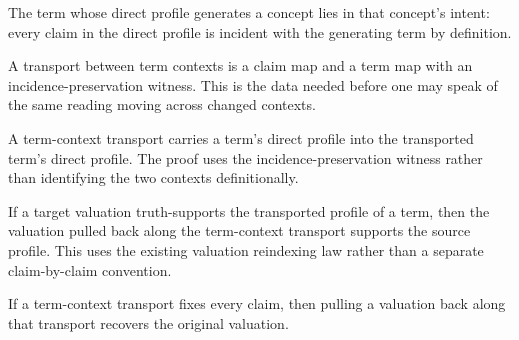\begin{theorem}\label{thm:claim-term-generated-intent}\leanok{}
The term whose direct profile generates a concept lies in that concept's intent:
every claim in the direct profile is incident with the generating term by
definition.
\end{theorem}

\begin{proposition}\label{thm:claim-term-context-hom}\leanok{}
A transport between term contexts is a claim map and a term map with an
incidence-preservation witness.  This is the data needed before one may speak
of the same reading moving across changed contexts.
\end{proposition}

\begin{theorem}\label{thm:claim-term-profile-transport}\leanok{}
A term-context transport carries a term's direct profile into the transported
term's direct profile.  The proof uses the incidence-preservation witness rather
than identifying the two contexts definitionally.
\end{theorem}

\begin{theorem}\label{thm:claim-term-profile-valuation-pullback}\leanok{}
If a target valuation truth-supports the transported profile of a term, then
the valuation pulled back along the term-context transport supports the source
profile.  This uses the existing valuation reindexing law rather than a
separate claim-by-claim convention.
\end{theorem}

\begin{theorem}\label{thm:claim-term-valuation-pullback-claim-fixing}\leanok{}
If a term-context transport fixes every claim, then pulling a valuation back
along that transport recovers the original valuation.
\end{theorem}

